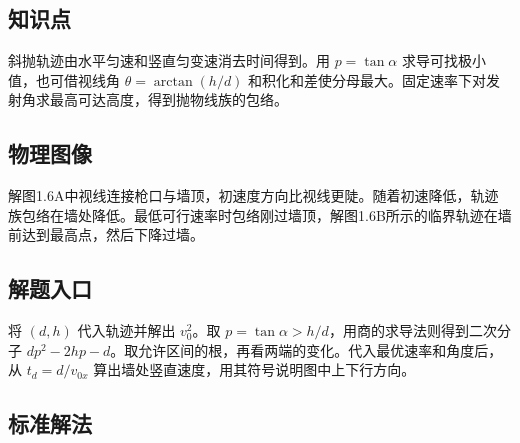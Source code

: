 \documentclass[UTF8,fontset=fandol,a4paper,11pt]{ctexart}
\begin{document}


\subsection*{知识点}

斜抛轨迹由水平匀速和竖直匀变速消去时间得到。用 $p=\tan\alpha$ 求导可找极小值，也可借视线角 $\theta=\arctan(h/d)$ 和积化和差使分母最大。固定速率下对发射角求最高可达高度，得到抛物线族的包络。




\subsection*{物理图像}

解图1.6A中视线连接枪口与墙顶，初速度方向比视线更陡。随着初速降低，轨迹族包络在墙处降低。最低可行速率时包络刚过墙顶，解图1.6B所示的临界轨迹在墙前达到最高点，然后下降过墙。



\subsection*{解题入口}

将 $(d,h)$ 代入轨迹并解出 $v_0^2$。取 $p=\tan\alpha>h/d$，用商的求导法则得到二次分子 $dp^2-2hp-d$。取允许区间的根，再看两端的变化。代入最优速率和角度后，从 $t_d=d/v_{0x}$ 算出墙处竖直速度，用其符号说明图中上下行方向。



\subsection*{标准解法}
\end{document}
